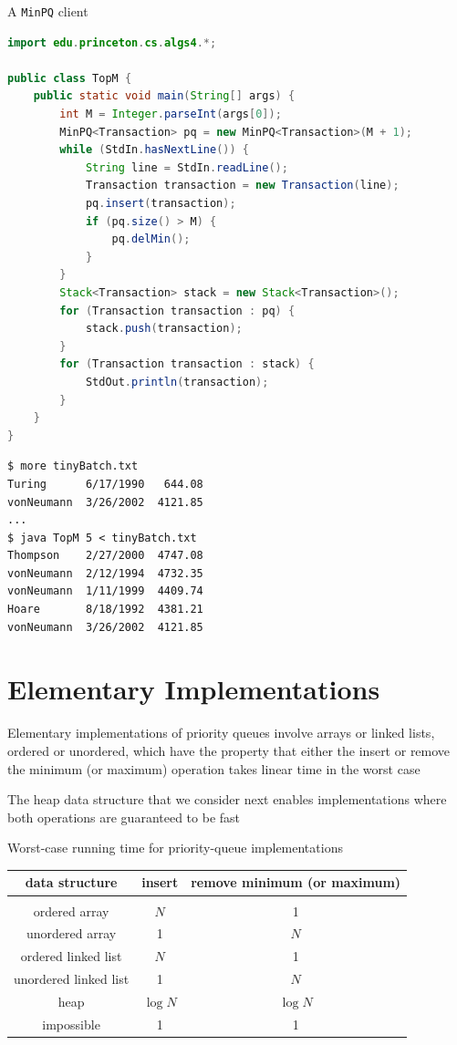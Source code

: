 \documentclass[8pt,a4paper,compress]{beamer}
\begin{document}
\begin{frame}[fragile]
A \lstinline{MinPQ} client
\begin{lstlisting}[language=Java]
import edu.princeton.cs.algs4.*;

public class TopM {   
    public static void main(String[] args) {
        int M = Integer.parseInt(args[0]); 
        MinPQ<Transaction> pq = new MinPQ<Transaction>(M + 1); 
        while (StdIn.hasNextLine()) {
            String line = StdIn.readLine();
            Transaction transaction = new Transaction(line);
            pq.insert(transaction); 
            if (pq.size() > M) { 
                pq.delMin(); 
            }
        }
        Stack<Transaction> stack = new Stack<Transaction>();
        for (Transaction transaction : pq) { 
            stack.push(transaction); 
        }
        for (Transaction transaction : stack) {
            StdOut.println(transaction); 
        } 
    }
} 
\end{lstlisting} 

\begin{lstlisting}[language={}]
$ more tinyBatch.txt 
Turing      6/17/1990   644.08
vonNeumann  3/26/2002  4121.85
...
$ java TopM 5 < tinyBatch.txt 
Thompson    2/27/2000  4747.08
vonNeumann  2/12/1994  4732.35
vonNeumann  1/11/1999  4409.74
Hoare       8/18/1992  4381.21
vonNeumann  3/26/2002  4121.85
\end{lstlisting} 
\end{frame}

\section{Elementary Implementations}
\begin{frame}[fragile]
Elementary implementations of priority queues involve arrays or linked lists, ordered or unordered, which have the property that either the insert or remove the minimum (or maximum) operation takes linear time in the worst case

\bigskip

The heap data structure that we consider next enables implementations where both operations are guaranteed to be fast

\bigskip

Worst-case running time for priority-queue implementations
\begin{center}
\begin{tabular}{ccc}
data structure & insert & remove minimum (or maximum) \\ \hline \\
ordered array & $N$ & 1 \\
unordered array & 1 & $N$ \\
ordered linked list & $N$ & 1 \\
unordered linked list & 1 & $N$ \\
heap & $\log N$ & $\log N$ \\
impossible & 1 & 1
\end{tabular} 
\end{center}
\end{frame}
\end{document}
